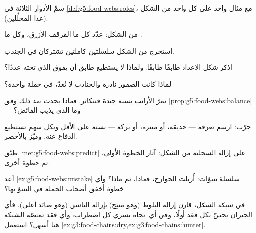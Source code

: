 \begin{exercise}[$\star$]\label{exo:g5:food-webs:2}
سمِّ الأدوار الثلاثة في \cref{def:g5:food-webs:roles}، مع مثال
واحد على كل واحد من الشكل (عدا المحلِّلين).
\end{exercise}

\begin{exercise}[$\star$]\label{exo:g5:food-webs:3}
من الشكل: عدّد كل ما  القرقف الأزرق، وكل ما .
\end{exercise}

\begin{exercise}[$\star$]\label{exo:g5:food-webs:4}
استخرج من الشكل سلسلتين كاملتين تشتركان في الجندب.
\end{exercise}

\begin{exercise}[$\star$]\label{exo:g5:food-webs:5}
اذكر شكل الأعداد طابقًا طابقًا. ولماذا لا يستطيع طابق أن يفوق الذي
تحته عددًا؟
\end{exercise}

\begin{exercise}[$\star$]\label{exo:g5:food-webs:6}
لماذا كانت الصقور نادرة والجنادب لا تُعدّ، في جملة واحدة؟
\end{exercise}

\begin{exercise}[$\star$]\label{exo:g5:food-webs:7}
تمرّ الأرانب بسنة جيدة فتتكاثر. فماذا يحدث بعد ذلك وفق
\cref{prop:g5:food-webs:balance} --- وما الذي يذيب الفائض؟
\end{exercise}

\begin{exercise}[$\star$]\label{exo:g5:food-webs:8}
جرّب: ارسم   تعرفه --- حديقة، أو متنزه، أو
بركة --- بستة  على الأقل وبكل سهم تستطيع الدفاع عنه. وميّز
 بالأخضر.
\end{exercise}

\begin{exercise}[$\star\star$]\label{exo:g5:food-webs:9}
طبّق \cref{met:g5:food-webs:predict} على إزالة السحلية من الشكل:
آثار الخطوة الأولى، ثم خطوة أخرى.
\end{exercise}

\begin{exercise}[$\star\star$]\label{exo:g5:food-webs:10}
أعد \cref{ex:g5:food-webs:mistake} سلسلةَ تنبؤات: أُزيلت الجوارح،
فماذا، ثم ماذا؟ وأي خطوة أخفق أصحاب الحملة في التنبؤ بها؟
\end{exercise}

\begin{exercise}[$\star\star\star$]\label{exo:g5:food-webs:11}
في شبكة الشكل، قارن إزالة البلوط (وهو منتِج) بإزالة الباشق (وهو
صائد أعلى). فأي الجيران يحسّ بكل فقد أولًا، وفي أي اتجاه يسري كل
اضطراب، وأي فقد تمتصّه الشبكة هنا أسهل؟ استعمل
\cref{ex:g3:food-chains:dry,ex:g3:food-chains:hunter}.
\end{exercise}
